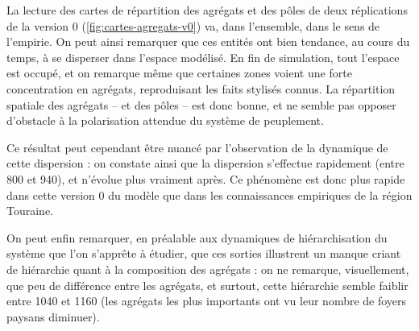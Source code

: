 \begin{mdframed}[backgroundcolor=gray!10,footnoteinside=false]
La lecture des cartes de répartition des agrégats et des pôles de deux réplications de la version 0 (\cref{fig:cartes-agregats-v0}) va, dans l'ensemble, dans le sens de l'empirie.
On peut ainsi remarquer que ces entités ont bien tendance, au cours du temps, à se disperser dans l'espace modélisé.
En fin de simulation, tout l'espace est occupé, et on remarque même que certaines zones voient une forte concentration en agrégats, reproduisant les faits stylisés connus.
La répartition spatiale des agrégats -- et des pôles -- est donc bonne, et ne semble pas opposer d'obstacle à la polarisation attendue du système de peuplement.

Ce résultat peut cependant être nuancé par l'observation de la dynamique de cette dispersion :
on constate ainsi que la dispersion s'effectue rapidement (entre 800 et 940), et n'évolue plus vraiment après.
Ce phénomène est donc plus rapide dans cette version 0 du modèle que dans les connaissances empiriques de la région Touraine.

On peut enfin remarquer, en préalable aux dynamiques de hiérarchisation du système que l'on s'apprête à étudier, que ces sorties illustrent un manque criant de hiérarchie quant à la composition des agrégats :
on ne remarque, visuellement, que peu de différence entre les agrégats, et surtout, cette hiérarchie semble faiblir entre 1040 et 1160 (les agrégats les plus importants ont vu leur nombre de foyers paysans diminuer).
\end{mdframed}

